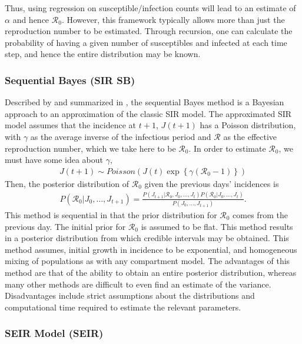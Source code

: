 \documentclass[12pt]{article}
\newcommand{\rr}{\ensuremath{\mathcal{R}_0}}
\begin{document}
Thus, using regression on susceptible/infection counts will lead to an estimate of $\alpha$ and hence $\rr$.  However, this framework typically allows more than just the reproduction number to be estimated.  Through recursion, one can calculate the probability of having a given number of susceptibles and infected at each time step, and hence the entire distribution may be known.





\subsubsection{Sequential Bayes (SIR SB)}\label{sec:seqbayes}

Described by \cite{bettencourt2008} and summarized in \cite{obadia2012r0}, the sequential Bayes method is a Bayesian approach to an approximation of the classic SIR model.  The approximated SIR model assumes that the incidence at $t+1$, $J(t+1)$ has a Poisson distribution, with $\gamma$ as the  average inverse of the infectious period and $\mathcal{R}$ as the effective reproduction number, which we take here to be $\rr$. In order to estimate $\rr$, we must have some idea about $\gamma$,
\begin{align*}
J(t+1)  \sim Poisson( J(t) \exp \left \{  \gamma (\rr-1)\right \})
\end{align*}
Then, the posterior distribution of $\rr$ given the previous days' incidences is
\begin{align*}
  P(\rr | J_0, \dots, J_{t+1}) = \frac{P(J_{t+1} | \rr, J_0, \dots, J_t)P(\rr| J_0, \dots, J_t)}{P(J_0, \dots, J_{t+1})}.
\end{align*}
This method is sequential in that the prior distribution for $\rr$ comes from the previous day.  The initial prior for $\rr$ is assumed to be flat.  This method results in a posterior distribution from which credible intervals may be obtained.  This method assumes, initial growth in incidence to be exponential, and homogeneous mixing of populations as with any compartment model.  The advantages of this method are that of the ability to obtain an entire posterior distribution, whereas many other methods are difficult to even find an estimate of the variance.  Disadvantages include strict assumptions about the distributions and computational time required to estimate the relevant parameters. 




\subsubsection{SEIR Model (SEIR)}
\label{sec:seir-model}
\end{document}
